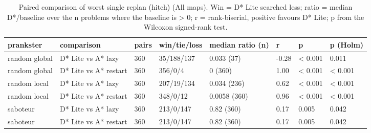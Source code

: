 \begin{table}[t]
\centering
\small
\caption{Paired comparison of worst single replan (hitch) (All maps). Win = D* Lite searched less; ratio = median D*/baseline over the n problems where the baseline is > 0; r = rank-biserial, positive favours D* Lite; p from the Wilcoxon signed-rank test.}
\label{tab:tests-hitch-all}
\begin{tabular}{llllllll}
\toprule
prankster & comparison & pairs & win/tie/loss & median ratio (n) & r & p & p (Holm) \\
\midrule
random global & D* Lite vs A* lazy & 360 & 35/188/137 & 0.033 (37) & -0.28 & < 0.001 & 0.011 \\
random global & D* Lite vs A* restart & 360 & 356/0/4 & 0 (360) & 1.00 & < 0.001 & < 0.001 \\
random local & D* Lite vs A* lazy & 360 & 207/19/134 & 0.034 (236) & 0.62 & < 0.001 & < 0.001 \\
random local & D* Lite vs A* restart & 360 & 348/0/12 & 0.0058 (360) & 0.96 & < 0.001 & < 0.001 \\
saboteur & D* Lite vs A* lazy & 360 & 213/0/147 & 0.82 (360) & 0.17 & 0.005 & 0.042 \\
saboteur & D* Lite vs A* restart & 360 & 213/0/147 & 0.82 (360) & 0.17 & 0.005 & 0.042 \\
\bottomrule
\end{tabular}
\end{table}
